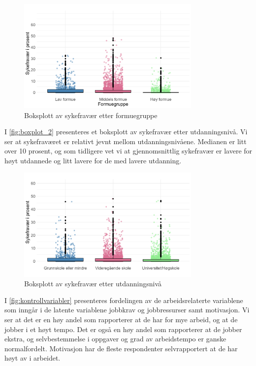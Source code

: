 \documentclass[
  12pt,
  a4paper,
  DIV=11,
  numbers=noendperiod]{scrartcl}
\begin{document}
\begin{figure}[H]
\caption{Boksplott av sykefravær etter formuegruppe}
\label{fig:boxplot}
\centering
\includegraphics[width=0.8\textwidth]{dokumentobjekter/figurer/fig_6.png}
\end{figure}

\newpage

I \autoref{fig:boxplot_2} presenteres et boksplott av sykefravær etter
utdanningsnivå. Vi ser at sykefraværet er relativt jevnt mellom
utdanningsnivåene. Medianen er litt over 10 prosent, og som tidligere
vet vi at gjennomsnittlig sykefravær er lavere for høyt utdannede og
litt lavere for de med lavere utdanning.

\vspace{-0.5cm}
\begin{figure}[H]
\caption{Boksplott av sykefravær etter utdanningsnivå}
\label{fig:boxplot_2}
\centering
\includegraphics[width=0.8\textwidth]{dokumentobjekter/figurer/fig_7.png}
\end{figure}
\vspace{-1cm}

I \autoref{fig:kontrollvariabler} presenteres fordelingen av de
arbeidsrelaterte variablene som inngår i de latente variablene jobbkrav
og jobbressurser samt motivasjon. Vi ser at det er en høy andel som
rapporterer at de har for mye arbeid, og at de jobber i et høyt tempo.
Det er også en høy andel som rapporterer at de jobber ekstra, og
selvbestemmelse i oppgaver og grad av arbeidstempo er ganske
normalfordelt. Motivasjon har de fleste respondenter selvrapportert at
de har høyt av i arbeidet.
\end{document}
